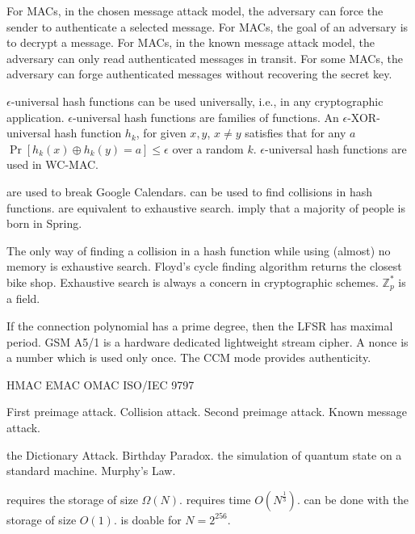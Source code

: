{For MACs, in the chosen message attack model, the adversary can force the sender to authenticate a selected message.}
{For MACs, the goal of an adversary is to decrypt a message.}
{For MACs, in the known message attack model, the adversary can only read authenticated messages in transit.}
{For some MACs, the adversary can forge authenticated messages without recovering the secret key.}
	
 {$\epsilon$-universal hash functions can be used universally, i.e., in any cryptographic application.}
 {$\epsilon$-universal hash functions are families of functions.}
 {An $\epsilon$-XOR-universal hash function $h_k$, for given $x,y$, $x \neq y$ satisfies that for any $a$ $\Pr[h_k(x)\oplus h_k(y) = a] \leq \epsilon$ over a random $k$.}
 {$\epsilon$-universal hash functions are used in WC-MAC.}
 
{are used to break Google Calendars.}
{can be used to find collisions in hash functions.}
{are equivalent to exhaustive search.}
{imply that a majority of people is born in Spring.}

{The only way of finding a collision in a hash function while using (almost) no memory is exhaustive search.}
{Floyd's cycle finding algorithm returns the closest bike shop.}
{Exhaustive search is always a concern in cryptographic schemes.}
{$\mathbb{Z}_p^*$ is a field.}

 {If the connection polynomial has a prime degree, then the LFSR has maximal period.}
 {GSM A5/1 is a hardware dedicated lightweight stream cipher.}
 {A nonce is a number which is used only once.}
 {The CCM mode provides authenticity.}

 
{HMAC}
{EMAC}
{OMAC}
{ISO/IEC 9797}

{First preimage attack.}
{Collision attack.}
{Second preimage attack.}
{Known message attack.}


{the Dictionary Attack.}
{ Birthday Paradox.}
{the simulation of quantum state on a standard machine.}
{Murphy's Law.}

{requires the storage of size $ \Omega(N).$}
{requires time $ O({N}^{\frac{1}{3}}).$}
{can be done with the storage of size  $O(1).$}
{is doable for $N=2^{256}$.}


